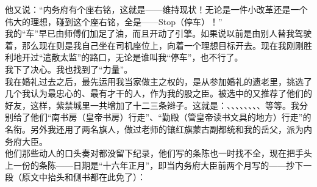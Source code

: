 他又说：“内务府有个座右铭，这就是——维持现状！无论是一件小改革还是一个伟大的理想，碰到这个座右铭，全是——Stop（停车）！”\\

我的“车”早已由师傅们加足了油，而且开动了引擎。如果说以前是由别人替我驾驶着，那么现在则是我自己坐在司机座位上，向着一个理想目标开去。现在我刚刚胜利地开过“遣散太监”的路口，无论是谁叫我“停车”，也不行了。\\

我下了决心。我也找到了“力量”。\\

我在婚礼过去之后，最先运用我当家做主之权的，是从参加婚礼的遗老里，挑选了几个我认为最忠心的、最有才干的人，作为我的股之臣。被选中的又推荐了他们的好友，这样，紫禁城里一共增加了十二三条辫子。这就是：、、、、、、、、等等。我分别给了他们“南书房（皇帝书房）行走”、“勤殿（管皇帝读书文具的地方）行走”的名衔。另外我还用了两名旗人，做过老师的镶红旗蒙古副都统和我的岳父，派为内务府大臣。\\

他们那些动人的口头奏对都没留下纪录，他们写的条陈也一时找不全，现在把手头上一份的条陈——日期是“十六年正月”，即当内务府大臣前两个月写的——抄下一段（原文中抬头和侧书都在此免了）：\\

